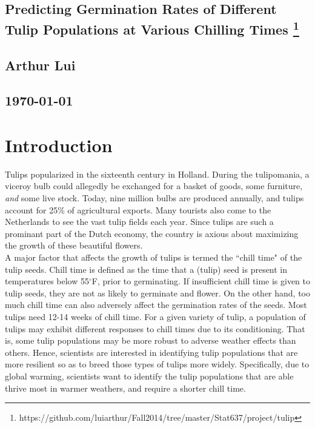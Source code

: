\documentclass[mathserif]{article}
\begin{document}
\begin{center}
  \section*{\textbf{Predicting Germination Rates of Different Tulip
                    Populations at Various Chilling Times}
    \footnote{https://github.com/luiarthur/Fall2014/tree/master/Stat637/project/tulip}
  }
  \subsection*{\textbf{Arthur Lui}}
  \subsection*{\noindent\today}
\end{center}

\section*{Introduction}
Tulips popularized in the sixteenth century in Holland. During the tulipomania,
a viceroy bulb could allegedly be exchanged for a basket of goods, some
furniture, \textit{and} some live stock. Today, nine million bulbs are produced
annually, and tulips account for 25\% of agricultural exports. Many tourists
also come to the Netherlands to see the vast tulip fields each year. Since
tulips are such a prominant part of the Dutch economy, the country is axious
about maximizing the growth of these beautiful flowers.\\

\noindent
A major factor that affects the growth of tulips is termed the ``chill time" of
the tulip seeds. Chill time is defined as the time that a (tulip) seed is
present in temperatures below 55$^\circ$F, prior to germinating. If
insufficient chill time is given to tulip seeds, they are not as likely to
germinate and flower. On the other hand, too much chill time can also adversely
affect the germination rates of the seeds.  Most tulips need 12-14 weeks of
chill time. For a given variety of tulip, a population of tulips may exhibit different
responses to chill times due to its conditioning. That is, some tulip populations
may be more robust to adverse weather effects than others. Hence, scientists are
interested in identifying tulip populations that are more resilient so as to 
breed those types of tulips more widely. Specifically, due to global warming, 
scientists want to identify the tulip populations that are able thrive most
in warmer weathers, and require a shorter chill time.\\
\end{document}
